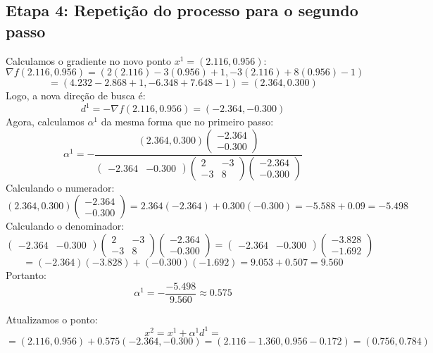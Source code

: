 \documentclass[a4paper, 12pt]{article}
\begin{document}
\subsection{Etapa 4: Repetição do processo para o segundo passo}

Calculamos o gradiente no novo ponto \( x^1 = (2.116, 0.956) \):
\[
\nabla f(2.116, 0.956) = (2(2.116) - 3(0.956) + 1, -3(2.116) + 8(0.956) - 1)
\]
\[
= (4.232 - 2.868 + 1, -6.348 + 7.648 - 1) = (2.364, 0.300)
\]
Logo, a nova direção de busca é:
\[
d^1 = -\nabla f(2.116, 0.956) = (-2.364, -0.300)
\]
Agora, calculamos \( \alpha^1 \) da mesma forma que no primeiro passo:
\[
\alpha^1 = -\frac{(2.364, 0.300) \begin{pmatrix} -2.364 \\ -0.300 \end{pmatrix}}{\begin{pmatrix} -2.364 & -0.300 \end{pmatrix} \begin{pmatrix} 2 & -3 \\ -3 & 8 \end{pmatrix} \begin{pmatrix} -2.364 \\ -0.300 \end{pmatrix}}
\]
Calculando o numerador:
\[
(2.364, 0.300) \begin{pmatrix} -2.364 \\ -0.300 \end{pmatrix} = 2.364(-2.364) + 0.300(-0.300) = -5.588 + 0.09 = -5.498
\]
Calculando o denominador:
\[
\begin{pmatrix} -2.364 & -0.300 \end{pmatrix} \begin{pmatrix} 2 & -3 \\ -3 & 8 \end{pmatrix} \begin{pmatrix} -2.364 \\ -0.300 \end{pmatrix} = \begin{pmatrix} -2.364 & -0.300 \end{pmatrix} \begin{pmatrix} -3.828 \\ -1.692 \end{pmatrix}
\]
\[
= (-2.364)(-3.828) + (-0.300)(-1.692) = 9.053 + 0.507 = 9.560
\]
Portanto:
\[
\alpha^1 = -\frac{-5.498}{9.560} \approx 0.575
\]

Atualizamos o ponto:
\[ 
x^2 = x^1 + \alpha^1 d^1 = 
\]
\[
=(2.116, 0.956) + 0.575(-2.364, -0.300) = (2.116 - 1.360, 0.956 - 0.172) =(0.756, 0.784)
\]
\end{document}
